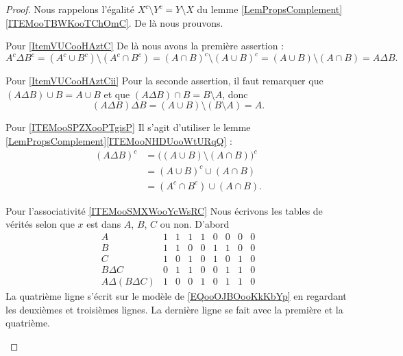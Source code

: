 \begin{proof}

    Nous rappelons l'égalité \( X^c\setminus Y^c=Y\setminus X\) du lemme \ref{LemPropsComplement}\ref{ITEMooTBWKooTChOmC}. De là nous prouvons.
    \begin{subproof}
    \item[Pour \ref{ItemVUCooHAztC}]
    De là nous avons la première assertion :
    \begin{equation}
        A^c\Delta B^c=(A^c\cup B^c)\setminus(A^c\cap B^c)=(A\cap B)^c\setminus(A\cup B)^c=(A\cup B)\setminus (A\cap B)=A\Delta B.
    \end{equation}
\item[Pour \ref{ItemVUCooHAztCii}]
    Pour la seconde assertion, il faut remarquer que \( (A\Delta B)\cup B=A\cup B\) et que \( (A\Delta B)\cap B=B\setminus A\), donc
    \begin{equation}
        (A\Delta B)\Delta B=(A\cup B)\setminus (B\setminus A)=A.
    \end{equation}

\item[Pour \ref{ITEMooSPZXooPTgisP}]
    Il s'agit d'utiliser le lemme \ref{LemPropsComplement}\ref{ITEMooNHDUooWtURqQ} :
    \begin{subequations}
        \begin{align}
            (A\Delta B)^c&=\Big( (A\cup B)\setminus (A\cap B) \Big)^c\\
            &=(A\cup B)^c\cup(A\cap B)\\
            &=(A^c\cap B^c)\cup(A\cap B).
        \end{align}
    \end{subequations}
\item[Pour l'associativité \ref{ITEMooSMXWooYcWsRC}]
           Nous écrivons les tables de vérités selon que \( x\) est dans \( A\), \( B\), \( C\) ou non. D'abord
           \begin{equation}
               \begin{array}{|c|c|c|c|c|c|c|c|c|}
                   A&1&1&1&1&0&0&0&0\\
                   B&1&1&0&0&1&1&0&0\\
                   C&1&0&1&0&1&0&1&0\\
                   \hline%
           B\Delta C&0&1&1&0&0&1&1&0\\
           \hline%
A\Delta (B\Delta C) &1&0&0&1&0&1&1&0     
               \end{array}
           \end{equation}
           La quatrième ligne s'écrit sur le modèle de \eqref{EQooOJBOooKkKbYp} en regardant les deuxièmes et troisièmes lignes. La dernière ligne se fait avec la première et la quatrième.


\end{subproof}
\end{proof}
